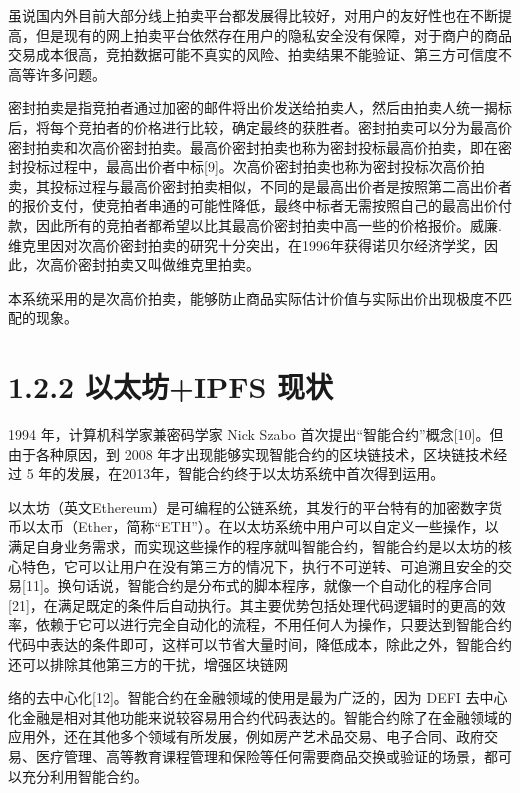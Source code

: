 \documentclass[
  10
]{article}
\begin{document}
虽说国内外目前大部分线上拍卖平台都发展得比较好，对用户的友好性也在不断提高，但是现有的网上拍卖平台依然存在用户的隐私安全没有保障，对于商户的商品交易成本很高，竞拍数据可能不真实的风险、拍卖结果不能验证、第三方可信度不高等许多问题。

密封拍卖是指竞拍者通过加密的邮件将出价发送给拍卖人，然后由拍卖人统一揭标后，将每个竞拍者的价格进行比较，确定最终的获胜者。密封拍卖可以分为最高价密封拍卖和次高价密封拍卖。最高价密封拍卖也称为密封投标最高价拍卖，即在密封投标过程中，最高出价者中标{[}9{]}。次高价密封拍卖也称为密封投标次高价拍卖，其投标过程与最高价密封拍卖相似，不同的是最高出价者是按照第二高出价者的报价支付，使竞拍者串通的可能性降低，最终中标者无需按照自己的最高出价付款，因此所有的竞拍者都希望以比其最高价密封拍卖中高一些的价格报价。威廉.维克里因对次高价密封拍卖的研究十分突出，在1996年获得诺贝尔经济学奖，因此，次高价密封拍卖又叫做维克里拍卖。

本系统采用的是次高价拍卖，能够防止商品实际估计价值与实际出价出现极度不匹配的现象。

\section{1.2.2 以太坊+IPFS
现状}\label{ux4ee5ux592aux574aipfs-ux73b0ux72b6}

1994 年，计算机科学家兼密码学家 Nick Szabo
首次提出``智能合约''概念{[}10{]}。但由于各种原因，到 2008
年才出现能够实现智能合约的区块链技术，区块链技术经过 5
年的发展，在2013年，智能合约终于以太坊系统中首次得到运用。

以太坊（英文Ethereum）是可编程的公链系统，其发行的平台特有的加密数字货币以太币（Ether，简称``ETH''）。在以太坊系统中用户可以自定义一些操作，以满足自身业务需求，而实现这些操作的程序就叫智能合约，智能合约是以太坊的核心特色，它可以让用户在没有第三方的情况下，执行不可逆转、可追溯且安全的交易{[}11{]}。换句话说，智能合约是分布式的脚本程序，就像一个自动化的程序合同{[}21{]}，在满足既定的条件后自动执行。其主要优势包括处理代码逻辑时的更高的效率，依赖于它可以进行完全自动化的流程，不用任何人为操作，只要达到智能合约代码中表达的条件即可，这样可以节省大量时间，降低成本，除此之外，智能合约还可以排除其他第三方的干扰，增强区块链网

络的去中心化{[}12{]}。智能合约在金融领域的使用是最为广泛的，因为 DEFI
去中心化金融是相对其他功能来说较容易用合约代码表达的。智能合约除了在金融领域的应用外，还在其他多个领域有所发展，例如房产艺术品交易、电子合同、政府交易、医疗管理、高等教育课程管理和保险等任何需要商品交换或验证的场景，都可以充分利用智能合约。
\end{document}
